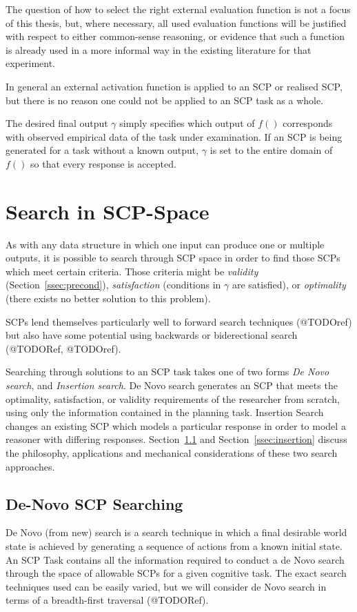 The question of how to select the right external evaluation function is not a focus of this thesis, but, where necessary, all used evaluation functions will be justified with respect to either common-sense reasoning, or evidence that such a function is already used in a more informal way in the existing literature for that experiment.

In general an external activation function is applied to an SCP or realised SCP, but there is no reason one could not be applied to an SCP task as a whole.

The desired final output $\gamma$ simply specifies which output of $f()$ corresponds with observed empirical data of the task under examination. If an SCP is being generated for a task without a known output, $\gamma$ is set to the entire domain of $f()$ so that every response is accepted.

\section{Search in SCP-Space}
As with any data structure in which one input can produce one or multiple outputs, it is possible to search through SCP space in order to find those SCPs which meet certain criteria. Those criteria might be \textit{validity} (Section~\ref{ssec:precond}), \textit{satisfaction} (conditions in $\gamma$ are satisfied), or \textit{optimality} (there exists no better solution to this problem).

SCPs lend themselves particularly well to forward search techniques (@TODOref) but also have some potential using backwards or biderectional search (@TODORef, @TODOref). 

Searching through solutions to an SCP task takes one of two forms \textit{De Novo search}, and \textit{Insertion search}. De Novo search generates an SCP that meets the optimality, satisfaction, or validity requirements of the researcher from scratch, using only the information contained in the planning task. Insertion Search changes an existing SCP which models a particular response in order to model a reasoner with differing responses. Section~\ref{ssec:denovo} and Section~\ref{ssec:insertion} discuss the philosophy, applications and mechanical considerations of these two search approaches.





\subsection{De-Novo SCP Searching} \label{ssec:denovo}
De Novo (from new) search is a search technique in which a final desirable world state is achieved by generating a sequence of actions from a known initial state. An SCP Task contains all the information required to conduct a de Novo search through the space of allowable SCPs for a given cognitive task. The exact search techniques used can be easily varied, but we will consider de Novo search in terms of a breadth-first traversal (@TODORef). 

